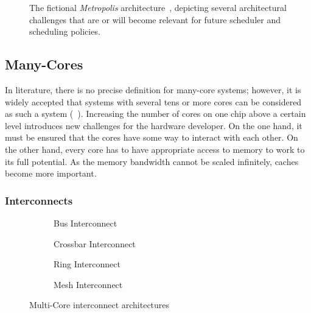 \begin{figure}[t!] \centering
	\caption[The fictional Metropolis architecture.]{The fictional \emph{Metropolis}  architecture~\cite{Singh-2007-Metropolis}, depicting several architectural challenges that are or will become relevant for future scheduler and scheduling policies.}%
	\label{fig:req:metro}
\end{figure}

\subsection{Many-Cores}%
\label{sec:env:many-core}

In literature, there is no precise definition for many-core systems; however, it is widely accepted that systems with several tens or more cores can be considered as such a system (\cf~\textcite[3]{Vajda-2011-ProgrammingManyCore}). Increasing the number of cores on one chip above a certain level introduces new challenges for the hardware developer. On the one hand, it must be ensured that the cores have some way to interact with each other. On the other hand, every core has to have appropriate access to memory to work to its full potential. As the memory bandwidth cannot be scaled infinitely, caches become more important.

\subsubsection{Interconnects}

\begin{figure}[t!]
	\centering
	\begin{subfigure}[b]{0.45\textwidth}\centering
		\vspace{0.5cm}
		\caption{Bus Interconnect}%
		\label{fig:req:bus}
	\end{subfigure}%
	\hfill
	\begin{subfigure}[b]{0.45\textwidth}\centering
		\caption{Crossbar Interconnect}%
		\label{fig:req:crossbar}
	\end{subfigure}\vspace{1cm}
	\begin{subfigure}[b]{0.45\textwidth}\centering
		\vspace{0.25cm}
		\caption{Ring Interconnect}%
		\label{fig:req:ring}
	\end{subfigure}%
	\hfill
	\begin{subfigure}[b]{0.45\textwidth}\centering
		\caption{Mesh Interconnect}%
		\label{fig:req:mesh}
	\end{subfigure}
	\caption{Multi-Core interconnect architectures}\label{fig:req:interconnects}
\end{figure}

